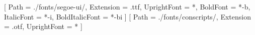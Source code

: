 \setmainfont{segoe-ui}[
    Path = ./fonts/segoe-ui/,
    Extension = .ttf,
    UprightFont = *,
    BoldFont = *-b,
    ItalicFont = *-i,
    BoldItalicFont = *-bi
]
\newfontfamily{}[
    Path = ./fonts/conscripts/,
    Extension = .otf,
    UprightFont = *
]
